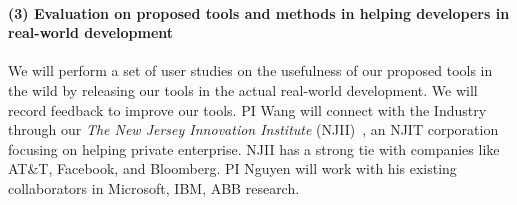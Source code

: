 \paragraph{{\bf (3) Evaluation on proposed tools and methods in helping developers in real-world development}}

We will perform a set of user studies on the usefulness of our
proposed tools in the wild by releasing our
tools in the actual real-world development. 
We will record feedback to improve our tools.
PI Wang will connect with the Industry through our \textit{The New Jersey Innovation Institute} (NJII)~\cite{njii}, an NJIT corporation focusing on helping private enterprise. NJII has a strong tie with companies like AT\&T, Facebook, and Bloomberg. PI Nguyen will work with his existing collaborators in Microsoft, IBM, ABB research.

